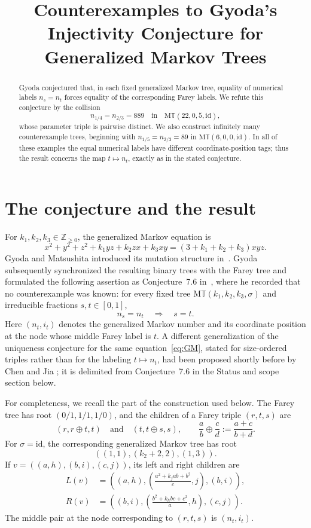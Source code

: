 \documentclass[11pt]{amsart}
\title[Gyoda's injectivity conjecture]{
  Counterexamples to Gyoda's Injectivity Conjecture
  for Generalized Markov Trees
}
\date{}
\newcommand{\GMT}{\mathrm{M}\mathbb{T}}
\newcommand{\id}{\mathrm{id}}
\begin{document}
\raggedbottom

\begin{abstract}
Gyoda conjectured that, in each fixed generalized Markov tree, equality of
numerical labels $n_s=n_t$ forces equality of the corresponding Farey labels.
We refute this conjecture by the collision
\[
 n_{1/4}=n_{2/3}=889
 \quad\text{in}\quad
 \GMT(22,0,5,\id),
\]
whose parameter triple is pairwise distinct. We also construct infinitely
many counterexample trees, beginning with
$n_{1/5}=n_{2/3}=89$ in $\GMT(6,0,0,\id)$. In all of these examples the
equal numerical labels have different coordinate-position tags; thus the
result concerns the map $t\mapsto n_t$, exactly as in the stated conjecture.
\end{abstract}

\maketitle

\section{The conjecture and the result}

For $k_1,k_2,k_3\in\mathbb Z_{\ge 0}$, the generalized Markov equation is
\begin{equation}\label{eq:GM}
 x^2+y^2+z^2+k_1yz+k_2zx+k_3xy
 =(3+k_1+k_2+k_3)xyz.
\end{equation}
Gyoda and Matsushita introduced its mutation structure
in~\cite{GyodaMatsushita}. Gyoda subsequently synchronized the resulting
binary trees with the Farey tree and formulated the following assertion as
Conjecture~7.6 in~\cite{Gyoda}, where he recorded that no counterexample was
known: for every fixed tree $\GMT(k_1,k_2,k_3,\sigma)$ and irreducible
fractions $s,t\in[0,1]$,
\[
 n_s=n_t \quad\Longrightarrow\quad s=t.
\]
Here $(n_t,i_t)$ denotes the generalized Markov number and its coordinate
position at the node whose middle Farey label is $t$. A different
generalization of the uniqueness conjecture for the same
equation~\eqref{eq:GM}, stated for size-ordered triples rather than for the
labeling $t\mapsto n_t$, had been proposed shortly before by Chen and Jia
\cite[Conjecture~8.2]{ChenJia}; it is delimited from Conjecture~7.6 in the
Status and scope section below.

For completeness, we recall the part of the construction used below. The
Farey tree has root $(0/1,1/1,1/0)$, and the children of a Farey triple
$(r,t,s)$ are
\[
 (r,r\mathbin\oplus t,t)
 \quad\text{and}\quad
 (t,t\mathbin\oplus s,s),
 \qquad
 \frac ab\mathbin\oplus\frac cd:=\frac{a+c}{b+d}.
\]
For $\sigma=\id$, the corresponding generalized Markov tree has root
\[
 ((1,1),(k_2+2,2),(1,3)).
\]
If $v=((a,h),(b,i),(c,j))$, its left and right children are
\begin{align*}
 L(v)
 &=
 \left(
   (a,h),
   \left(\frac{a^2+k_jab+b^2}{c},j\right),
   (b,i)
 \right),\\
 R(v)
 &=
 \left(
   (b,i),
   \left(\frac{b^2+k_hbc+c^2}{a},h\right),
   (c,j)
 \right).
\end{align*}
The middle pair at the node corresponding to $(r,t,s)$ is $(n_t,i_t)$.
\end{document}

